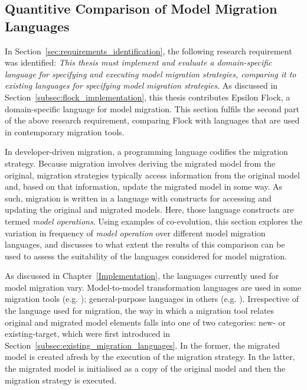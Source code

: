 
\subsection{Quantitive Comparison of Model Migration Languages}
In Section~\ref{sec:requirements_identification}, the following research requirement was identified: \emph{This thesis must implement and evaluate a domain-specific language for specifying and executing model migration strategies, comparing it to existing languages for specifying model migration strategies.} As discussed in Section~\ref{subsec:flock_implementation}, this thesis contributes Epsilon Flock, a domain-specific language for model migration. This section fulfils the second part of the above research requirement, comparing Flock with languages that are used in contemporary migration tools. 

In developer-driven migration, a programming language codifies the migration strategy. Because migration involves deriving the migrated model from the original, migration strategies typically access information from the original model and, based on that information, update the migrated model in some way. As such, migration is written in a language with constructs for accessing and updating the original and migrated models. Here, those language constructs are termed \textit{model operations}. Using examples of co-evolution, this section explores the variation in frequency of \emph{model operation} over different model migration languages, and discusses to what extent the results of this comparison can be used to assess the suitability of the languages considered for model migration.

As discussed in Chapter~\ref{Implementation}, the languages currently used for model migration vary. Model-to-model transformation languages are used in some migration tools (e.g. \cite{cicchetti08automating,garces09managing}); general-purpose languages in others (e.g. \cite{herrmannsdoerfer09cope,hussey06advanced}). Irrespective of the language used for migration, the way in which a migration tool relates original and migrated model elements falls into one of two categories: new- or existing-target, which were first introduced in Section~\ref{subsec:existing_migration_languages}. In the former, the migrated model is created afresh by the execution of the migration strategy. In the latter, the migrated model is initialised as a copy of the original model and then the migration strategy is executed.

